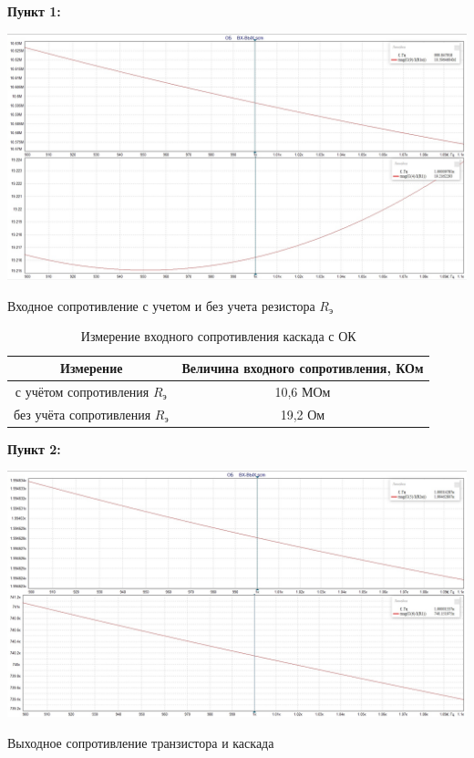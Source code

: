 \documentclass[a4paper,14pt]{extarticle}
\begin{document}
    \newpage
    \textbf{Пункт 1:}
    \begin{center}
        \includegraphics[scale=0.25]{1.jpg}
    \end{center}
    \begin{center}
        Входное сопротивление с учетом и без учета резистора $R_{\text{э}}$ 
    \end{center}
    \begin{table}[ht]
        \begin{center}
            \caption{Измерение входного сопротивления каскада с ОК}
            \begin{tabular}{ |c|c| }
                \hline
                Измерение & Величина входного сопротивления, КОм\\
                \hline
                с учётом сопротивления $R_{\text{э}}$ & 10,6 МОм\\
                \hline
                без учёта сопротивления $R_{\text{э}}$ & 19,2 Ом\\
                \hline
            \end{tabular}
        \end{center}
    \end{table}

    \newpage
    \textbf{Пункт 2:}
    \begin{center}
        \includegraphics[scale=0.25]{2.jpg}
    \end{center}
    \begin{center}
        Выходное сопротивление транзистора и каскада
    \end{center}
\end{document}
